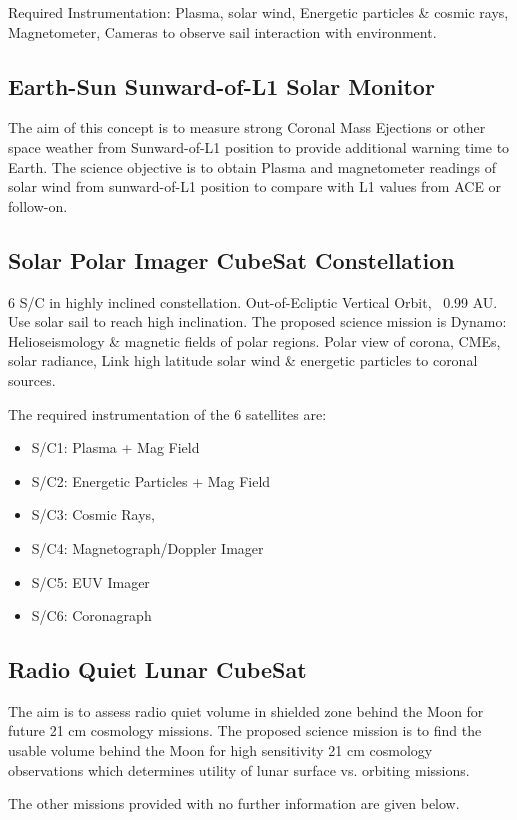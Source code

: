 \documentclass[11pt,a4paper]{report}
\begin{document}
Required Instrumentation: Plasma, solar wind, Energetic particles \& cosmic rays, Magnetometer, Cameras to observe sail interaction with environment.

\subsection{Earth-Sun Sunward-of-L1 Solar Monitor}
The aim of this concept is to measure strong Coronal Mass Ejections or other space weather from Sunward-of-L1 position to provide additional warning time to Earth. The science objective is to obtain Plasma and magnetometer readings of solar wind from sunward-of-L1 position to compare with L1 values from ACE or follow-on.

\subsection{Solar Polar Imager CubeSat Constellation}
6 S/C in highly inclined constellation. Out-of-Ecliptic Vertical Orbit, ~0.99 AU. Use solar sail to reach high inclination. The proposed science mission is Dynamo: Helioseismology \& magnetic fields of polar regions. 
Polar view of corona, CMEs, solar radiance, Link high latitude solar wind \& energetic particles to coronal sources. 

The required instrumentation of the 6  satellites are:
\begin{itemize}
\item S/C1: Plasma + Mag Field 
\item S/C2: Energetic Particles + Mag Field 
\item S/C3: Cosmic Rays, 
\item S/C4: Magnetograph/Doppler Imager 
\item S/C5: EUV Imager 
\item S/C6: Coronagraph 
\end{itemize}

\subsection{Radio Quiet Lunar CubeSat}
The aim is to assess radio quiet volume in shielded zone behind the Moon for future 21 cm cosmology missions. The proposed science mission is to find the usable volume behind the Moon for high sensitivity 21 cm cosmology observations which determines utility of lunar surface vs. orbiting missions. 

The other missions provided with no further information are given below. 
\end{document}
